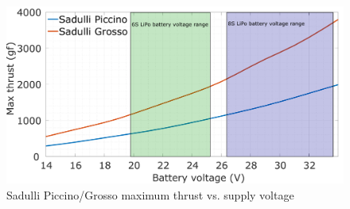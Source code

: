 \begin{figure}[!hbt]
    \centerline{\includegraphics[width=1\textwidth]{figures/thrust_graphs/maxthrust_vs_voltage.pdf}}
    \caption{Sadulli Piccino/Grosso maximum thrust vs. supply voltage}
\end{figure}
